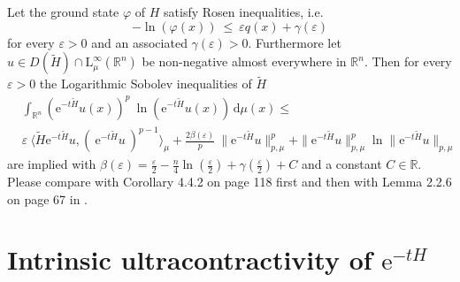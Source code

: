 \documentclass[12pt,longbibliography]{article}
\def\R{\mathbb{R}}
\def\d{\,\mathrm{d}}
\theoremstyle{definition}
\theoremstyle{remark}
\theoremstyle{example}
\begin{document}
Let the ground state $\varphi$ of $H$ satisfy Rosen inequalities, i.e.
\begin{equation} \label{Rosen_inequalities}
-\ln \left( \varphi (x) \right) \ \leq \ \varepsilon q(x) + \gamma(\varepsilon)
\end{equation} 
for every $\varepsilon > 0$ and an associated $\gamma(\varepsilon) > 0$. Furthermore let
$u \in D(\tilde{H}) \cap \mathrm{L}^{\infty}_{\mu}(\R^{n})$ be non-negative almost everywhere in $\R^{n}$.
Then for every $\varepsilon > 0$ the Logarithmic Sobolev inequalities of $\tilde{H}$ 
\begin{align*}
& \int_{\R^{n}} \left( \mathrm{e}^{-t\tilde{H}} u(x) \right)^{p} \ \ln \left( \mathrm{e}^{-t\tilde{H}} u (x) \right) \d \mu(x) \leq \\ 
& \varepsilon \ 
\langle \tilde{H} \mathrm{e}^{-t\tilde{H}} u, (\ \mathrm{e}^{-t\tilde{H}} u \ )^{p-1} \rangle_{\mu} 
 + \frac{2\beta(\varepsilon)}{p} \ \| \mathrm{e}^{-t\tilde{H}} u \|_{p, \mu}^{p} + \| \mathrm{e}^{-t\tilde{H}} u \|_{p, \mu}^{p}  \ln  \| \mathrm{e}^{-t\tilde{H}} u \|_{p, \mu}
\end{align*}
are implied with $\beta(\varepsilon) = \frac{\varepsilon}{2} - \frac{n}{4} \ln( \frac{\varepsilon}{2}) + \gamma( \frac{\varepsilon}{2}) + C$
and a constant $C \in \R$. Please compare with Corollary 4.4.2 on page 118 first and then with Lemma 2.2.6 on page
67 in \cite{Davies07}.\\ 







\section{Intrinsic ultracontractivity of $\mathrm{e}^{-tH}$} \label{IU_e^-tH}
\end{document}
